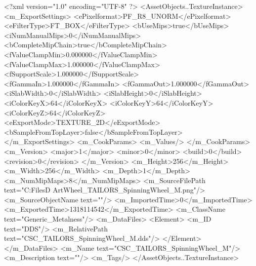 <?xml version="1.0" encoding="UTF-8" ?>
<AssetObjects..TextureInstance>
	<m_ExportSettings>
		<ePixelformat>PF_R8_UNORM</ePixelformat>
		<eFilterType>FT_BOX</eFilterType>
		<bUseMips>true</bUseMips>
		<iNumManualMips>0</iNumManualMips>
		<bCompleteMipChain>true</bCompleteMipChain>
		<fValueClampMin>0.000000</fValueClampMin>
		<fValueClampMax>1.000000</fValueClampMax>
		<fSupportScale>1.000000</fSupportScale>
		<fGammaIn>1.000000</fGammaIn>
		<fGammaOut>1.000000</fGammaOut>
		<iSlabWidth>0</iSlabWidth>
		<iSlabHeight>0</iSlabHeight>
		<iColorKeyX>64</iColorKeyX>
		<iColorKeyY>64</iColorKeyY>
		<iColorKeyZ>64</iColorKeyZ>
		<eExportMode>TEXTURE_2D</eExportMode>
		<bSampleFromTopLayer>false</bSampleFromTopLayer>
	</m_ExportSettings>
	<m_CookParams>
		<m_Values/>
	</m_CookParams>
	<m_Version>
		<major>1</major>
		<minor>0</minor>
		<build>0</build>
		<revision>0</revision>
	</m_Version>
	<m_Height>256</m_Height>
	<m_Width>256</m_Width>
	<m_Depth>1</m_Depth>
	<m_NumMipMaps>8</m_NumMipMaps>
	<m_SourceFilePath text="C:\Users\Shadow\Desktop\Working Files\3D Art\Props\Tailors\Spinning Wheel\CSC_TAILORS_SpinningWheel_M.png"/>
	<m_SourceObjectName text=""/>
	<m_ImportedTime>0</m_ImportedTime>
	<m_ExportedTime>1318114542</m_ExportedTime>
	<m_ClassName text="Generic_Metalness"/>
	<m_DataFiles>
		<Element>
			<m_ID text="DDS"/>
			<m_RelativePath text="CSC_TAILORS_SpinningWheel_M.dds"/>
		</Element>
	</m_DataFiles>
	<m_Name text="CSC_TAILORS_SpinningWheel_M"/>
	<m_Description text=""/>
	<m_Tags/>
</AssetObjects..TextureInstance>

